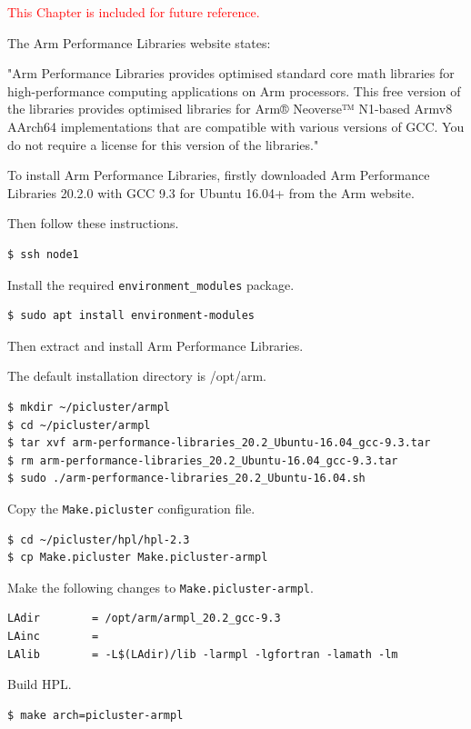 \documentclass{report}
\begin{document}
\textcolor{red}{This Chapter is included for future reference.}

The Arm Performance Libraries website states:

"Arm Performance Libraries provides optimised standard core math libraries for high-performance computing applications on Arm processors. This free version of the libraries provides optimised libraries for Arm® Neoverse™ N1-based Armv8 AArch64 implementations that are compatible with various versions of GCC. You do not require a license for this version of the libraries."

To install Arm Performance Libraries, firstly downloaded Arm Performance Libraries 20.2.0 with GCC 9.3 for Ubuntu 16.04+ from the Arm website.

Then follow these instructions.

\lstset{style=type}
\begin{lstlisting}
$ ssh node1
\end{lstlisting}

Install the required \verb|environment_modules| package.

\lstset{style=type}
\begin{lstlisting}
$ sudo apt install environment-modules
\end{lstlisting}

Then extract and install Arm Performance Libraries.

The default installation directory is /opt/arm.

\lstset{style=type}
\begin{lstlisting}
$ mkdir ~/picluster/armpl
$ cd ~/picluster/armpl
$ tar xvf arm-performance-libraries_20.2_Ubuntu-16.04_gcc-9.3.tar
$ rm arm-performance-libraries_20.2_Ubuntu-16.04_gcc-9.3.tar
$ sudo ./arm-performance-libraries_20.2_Ubuntu-16.04.sh
\end{lstlisting}

Copy the \verb|Make.picluster| configuration file.

\lstset{style=type}
\begin{lstlisting}
$ cd ~/picluster/hpl/hpl-2.3
$ cp Make.picluster Make.picluster-armpl
\end{lstlisting}

Make the following changes to \verb|Make.picluster-armpl|.

\lstset{style=listing}
\begin{lstlisting}[caption=Make.picluster-armpl, numbers=none]
LAdir        = /opt/arm/armpl_20.2_gcc-9.3
LAinc        =
LAlib        = -L$(LAdir)/lib -larmpl -lgfortran -lamath -lm
\end{lstlisting}

Build HPL.

\lstset{style=type}
\begin{lstlisting}
$ make arch=picluster-armpl
\end{lstlisting}


%
%
\end{document}
